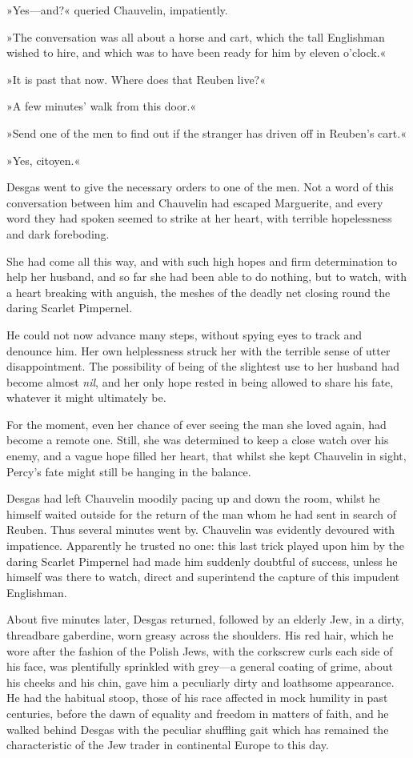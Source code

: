 »Yes—and?« queried Chauvelin, impatiently.

»The conversation was all about a horse and cart, which the tall Englishman wished to hire, and which was to have been ready for him by eleven o'clock.«

»It is past that now. Where does that Reuben live?«

»A few minutes' walk from this door.«

»Send one of the men to find out if the stranger has driven off in Reuben's cart.«

»Yes, citoyen.«

Desgas went to give the necessary orders to one of the men. Not a word of this conversation between him and Chauvelin had escaped Marguerite, and every word they had spoken seemed to strike at her heart, with terrible hopelessness and dark foreboding.

She had come all this way, and with such high hopes and firm determination to help her husband, and so far she had been able to do nothing, but to watch, with a heart breaking with anguish, the meshes of the deadly net closing round the daring Scarlet Pimpernel.

He could not now advance many steps, without spying eyes to track and denounce him. Her own helplessness struck her with the terrible sense of utter disappointment. The possibility of being of the slightest use to her husband had become almost \textit{nil}, and her only hope rested in being allowed to share his fate, whatever it might ultimately be.

For the moment, even her chance of ever seeing the man she loved again, had become a remote one. Still, she was determined to keep a close watch over his enemy, and a vague hope filled her heart, that whilst she kept Chauvelin in sight, Percy's fate might still be hanging in the balance.

Desgas had left Chauvelin moodily pacing up and down the room, whilst he himself waited outside for the return of the man whom he had sent in search of Reuben. Thus several minutes went by. Chauvelin was evidently devoured with impatience. Apparently he trusted no one: this last trick played upon him by the daring Scarlet Pimpernel had made him suddenly doubtful of success, unless he himself was there to watch, direct and superintend the capture of this impudent Englishman.

About five minutes later, Desgas returned, followed by an elderly Jew, in a dirty, threadbare gaberdine, worn greasy across the shoulders. His red hair, which he wore after the fashion of the Polish Jews, with the corkscrew curls each side of his face, was plentifully sprinkled with grey—a general coating of grime, about his cheeks and his chin, gave him a peculiarly dirty and loathsome appearance. He had the habitual stoop, those of his race affected in mock humility in past centuries, before the dawn of equality and freedom in matters of faith, and he walked behind Desgas with the peculiar shuffling gait which has remained the characteristic of the Jew trader in continental Europe to this day.

